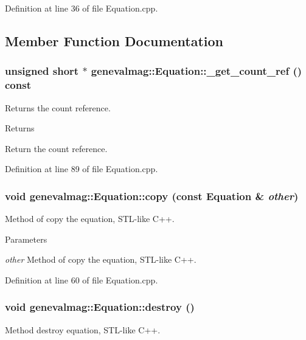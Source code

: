 Definition at line 36 of file Equation.cpp.



\subsection{Member Function Documentation}
\hypertarget{classgenevalmag_1_1Equation_ab900ac60c5c2b4427970f7d68361db20}{
\subsubsection[{\_\-get\_\-count\_\-ref}]{\setlength{\rightskip}{0pt plus 5cm}unsigned short $\ast$ genevalmag::Equation::\_\-get\_\-count\_\-ref () const}}
\label{classgenevalmag_1_1Equation_ab900ac60c5c2b4427970f7d68361db20}
Returns the count reference. \begin{DoxyReturn}{Returns}

\end{DoxyReturn}
Return the count reference. 

Definition at line 89 of file Equation.cpp.

\hypertarget{classgenevalmag_1_1Equation_a25cb4f7a1a49ac1d1408fc54e1d1378e}{
\subsubsection[{copy}]{\setlength{\rightskip}{0pt plus 5cm}void genevalmag::Equation::copy (const {\bf Equation} \& {\em other})}}
\label{classgenevalmag_1_1Equation_a25cb4f7a1a49ac1d1408fc54e1d1378e}
Method of copy the equation, STL-\/like C++. 
\begin{DoxyParams}{Parameters}
\item[{\em other}]Method of copy the equation, STL-\/like C++. \end{DoxyParams}


Definition at line 60 of file Equation.cpp.

\hypertarget{classgenevalmag_1_1Equation_a3314fa8459cfd0f0316daa6d38a895ee}{
\subsubsection[{destroy}]{\setlength{\rightskip}{0pt plus 5cm}void genevalmag::Equation::destroy ()}}
\label{classgenevalmag_1_1Equation_a3314fa8459cfd0f0316daa6d38a895ee}
Method destroy equation, STL-\/like C++. 

